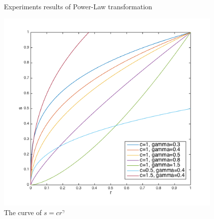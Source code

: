 \begin{figure}[h]
{		\label{fig:psubfig6}}
	\caption{Experiments results of Power-Law transformation}
	\label{fig:powerfig}
\end{figure}
\par
\begin{figure}[h]
	\centering
	\includegraphics[scale=0.3]{powercr}
	\caption{The curve of $s = cr^{\gamma}$}
	\label{fig:curvepower}
\end{figure}
